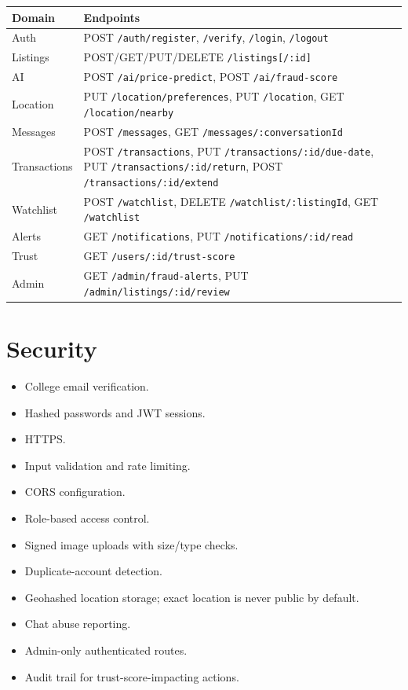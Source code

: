 \documentclass[11pt,a4paper]{article}
\begin{document}
\begin{longtable}{P{0.18\textwidth}P{0.72\textwidth}}
\toprule
\textbf{Domain} & \textbf{Endpoints}\\
\midrule
\endhead
Auth & POST \texttt{/auth/register}, \texttt{/verify}, \texttt{/login}, \texttt{/logout}\\
Listings & POST/GET/PUT/DELETE \texttt{/listings[/:id]}\\
AI & POST \texttt{/ai/price-predict}, POST \texttt{/ai/fraud-score}\\
Location & PUT \texttt{/location/preferences}, PUT \texttt{/location}, GET \texttt{/location/nearby}\\
Messages & POST \texttt{/messages}, GET \texttt{/messages/:conversationId}\\
Transactions & POST \texttt{/transactions}, PUT \texttt{/transactions/:id/due-date}, PUT \texttt{/transactions/:id/return}, POST \texttt{/transactions/:id/extend}\\
Watchlist & POST \texttt{/watchlist}, DELETE \texttt{/watchlist/:listingId}, GET \texttt{/watchlist}\\
Alerts & GET \texttt{/notifications}, PUT \texttt{/notifications/:id/read}\\
Trust & GET \texttt{/users/:id/trust-score}\\
Admin & GET \texttt{/admin/fraud-alerts}, PUT \texttt{/admin/listings/:id/review}\\
\bottomrule
\end{longtable}

\section{Security}

\begin{itemize}
    \item College email verification.
    \item Hashed passwords and JWT sessions.
    \item HTTPS.
    \item Input validation and rate limiting.
    \item CORS configuration.
    \item Role-based access control.
    \item Signed image uploads with size/type checks.
    \item Duplicate-account detection.
    \item Geohashed location storage; exact location is never public by default.
    \item Chat abuse reporting.
    \item Admin-only authenticated routes.
    \item Audit trail for trust-score-impacting actions.
\end{itemize}
\end{document}
